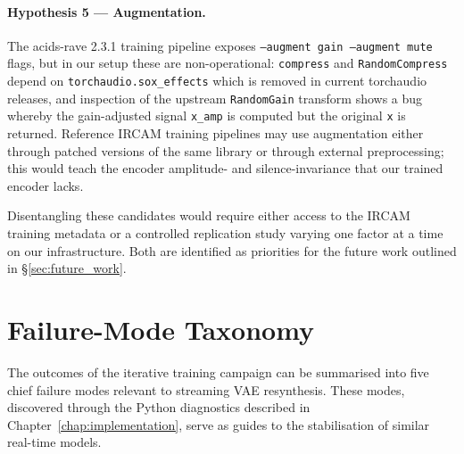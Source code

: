 \documentclass[a4paper,11pt,oneside,openany]{book}
\begin{document}
\paragraph{Hypothesis 5 --- Augmentation.} The acids-rave 2.3.1 training pipeline exposes \texttt{--augment gain --augment mute} flags, but in our setup these are non-operational: \texttt{compress} and \texttt{RandomCompress} depend on \texttt{torchaudio.sox\_effects} which is removed in current torchaudio releases, and inspection of the upstream \texttt{RandomGain} transform shows a bug whereby the gain-adjusted signal \texttt{x\_amp} is computed but the original \texttt{x} is returned. Reference IRCAM training pipelines may use augmentation either through patched versions of the same library or through external preprocessing; this would teach the encoder amplitude- and silence-invariance that our trained encoder lacks.

Disentangling these candidates would require either access to the IRCAM training metadata or a controlled replication study varying one factor at a time on our infrastructure. Both are identified as priorities for the future work outlined in \S\ref{sec:future_work}.

\section{Failure-Mode Taxonomy}\label{sec:failure_taxonomy}

The outcomes of the iterative training campaign can be summarised into five chief failure modes relevant to streaming VAE resynthesis. These modes, discovered through the Python diagnostics described in Chapter~\ref{chap:implementation}, serve as guides to the stabilisation of similar real-time models.
\end{document}
